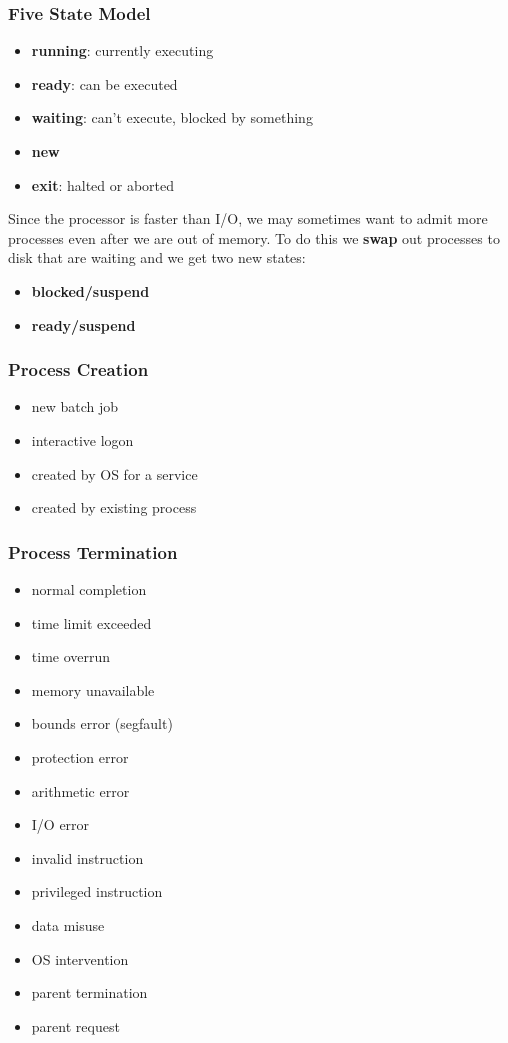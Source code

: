 \documentclass[]{article}
\theoremstyle{definition}
\begin{document}
			\subsubsection{Five State Model}
				\begin{itemize}
					\item \textbf{running}: currently executing
					\item \textbf{ready}:	can be executed
					\item \textbf{waiting}:	can't execute, blocked by something
					\item \textbf{new}
					\item \textbf{exit}:	halted or aborted
				\end{itemize}
				Since the processor is faster than I/O, we may sometimes want to admit more processes even after we are out of memory. To do this we \textbf{swap} out processes to disk that are waiting and we get two new states:
				\begin{itemize}
					\item \textbf{blocked/suspend}
					\item \textbf{ready/suspend}
				\end{itemize}
			\subsubsection{Process Creation}
				\begin{itemize}
					\item new batch job
					\item interactive logon
					\item created by OS for a service
					\item created by existing process
				\end{itemize}
			\subsubsection{Process Termination}
				\begin{multicols}{2}
					\begin{itemize}
						\item normal completion
						\item time limit exceeded
						\item time overrun				
						\item memory unavailable
						\item bounds error (segfault)
						\item protection error
						\item arithmetic error				
						\item I/O error
						\item invalid instruction
						\item privileged instruction
						\item data misuse
						\item OS intervention
						\item parent termination
						\item parent request
					\end{itemize}
				\end{multicols}
\end{document}
